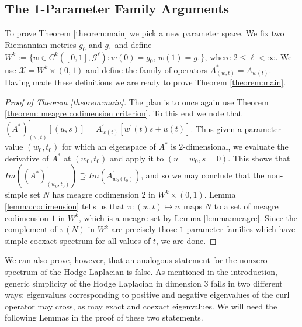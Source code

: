 \subsection{The 1-Parameter Family Arguments}
\label{subsection: the one parameter family arguments}
To prove Theorem \ref{theorem:main} we pick a new parameter space. We fix two Riemannian metrics $g_0$ and $g_1$ and define $W^k:=\{w\in C^k([0,1],\mathcal{G}^\ell):w(0)=g_0, \,w(1)=g_1\}$, where $2\leq \ell <\infty$. We use $\mathcal{X}=W^k\times (0,1)$ and define the family of operators $A^{\ast}_{(w,t)}=A_{w(t)}$. Having made these definitions we are ready to prove Theorem \ref{theorem:main}.


\begin{proof}[Proof of Theorem \ref{theorem:main}]
The plan is to once again use Theorem \ref{theorem: meagre codimension criterion}. To this end we note that $(A^\ast)^\prime_{(w,t)}[(u,s)]=A^\prime_{w(t)}[w^\prime(t)s+u(t)]$. Thus given a parameter value $(w_0,t_0)$ for which an eigenspace of $A^\ast$ is $2$-dimensional, we evaluate the derivative of $A^\ast$ at $(w_0,t_0)$ and apply it to $(u=w_0,s=0)$. This shows that $Im((A^\ast)^\prime_{(w_0,t_0)})\supseteq Im(A^\prime_{w_0(t_0)})$, and so we may conclude that the non-simple set $N$ has meagre codimension $2$ in $W^k\times (0,1)$. Lemma \ref{lemma:codimension} tells us that $\pi:(w,t)\mapsto w$ maps $N$ to a set of meagre codimension $1$ in $W^k$, which is a meagre set by Lemma \ref{lemma:meagre}. Since the complement of $\pi(N)$ in $W^k$ are precisely those $1$-parameter families which have simple coexact spectrum for all values of $t$, we are done.
\end{proof}

We can also prove, however, that an analogous statement for the nonzero spectrum of the Hodge Laplacian is false. As mentioned in the introduction, generic simplicity of the Hodge Laplacian in dimension $3$ fails in two different ways: eigenvalues corresponding to positive and negative eigenvalues of the curl operator may cross, as may exact and coexact eigenvalues. We will need the following Lemmas in the proof of these two statements.

